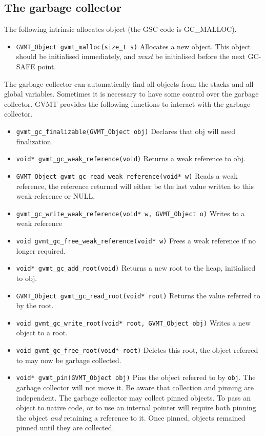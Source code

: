 \subsection{The garbage collector\label{sect:user-roots}}

The following intrinsic allocates object (the GSC code is GC\_MALLOC).
\begin{itemize}
\item \verb|GVMT_Object gvmt_malloc(size_t s)| Allocates a new object. This object should be initialised immediately, and \emph{must} be initialised before the next GC-SAFE point.
\end{itemize}

The garbage collector can automatically find all objects from the stacks and all global variables. Sometimes it is necessary to have some control over the garbage collector.
GVMT provides the following functions to interact with the garbage collector.
\begin{itemize}
\item \verb|gvmt_gc_finalizable(GVMT_Object obj)| Declares that obj will need finalization.
\item \verb|void* gvmt_gc_weak_reference(void)| Returns a weak reference to obj.
\item \verb|GVMT_Object gvmt_gc_read_weak_reference(void* w)| Reads a weak reference, the reference returned will either be the last value written to this weak-reference or NULL.
\item \verb|gvmt_gc_write_weak_reference(void* w, GVMT_Object o)| Writes to a weak reference
\item \verb|void gvmt_gc_free_weak_reference(void* w)| Frees a weak reference if no longer required.
\item \verb|void* gvmt_gc_add_root(void)| Returns a new root to the heap, initialised to obj.
\item \verb|GVMT_Object gvmt_gc_read_root(void* root)| Returns the value referred to by the root.
\item \verb|void gvmt_gc_write_root(void* root, GVMT_Object obj)| Writes a new object to a root.
\item \verb|void gvmt_gc_free_root(void* root)| Deletes this root, the object referred to may now be garbage collected.

\item \verb|void* gvmt_pin(GVMT_Object obj)| Pins the object referred to by \verb|obj|. The garbage collector will not move it. Be aware that collection and pinning are independent. The garbage collector may collect pinned objects. To pass an object to native code, or to use an internal pointer will require both pinning the object \emph{and} retaining a reference to it. Once pinned, objects remained pinned until they are collected.

\end{itemize}

